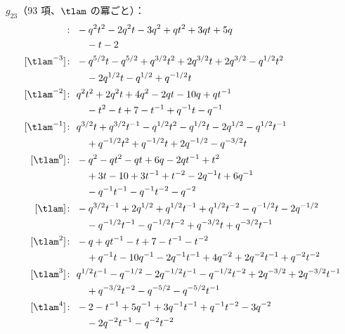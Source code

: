 $g_{23}$（93 項、$\tlam$ の冪ごと）：
\begin{align*}
[\tlam^{-4}]\colon\ & -q^{2} t^{2} -2 q^{2} t -3 q^{2} +q t^{2} +3 q t +5 q \\
& \quad -t -2 \\
[\tlam^{-3}]\colon\ & -q^{5/2} t -q^{5/2} +q^{3/2} t^{2} +2 q^{3/2} t +2 q^{3/2} -q^{1/2} t^{2} \\
& \quad -2 q^{1/2} t -q^{1/2} +q^{-1/2} t \\
[\tlam^{-2}]\colon\ & q^{2} t^{2} +2 q^{2} t +4 q^{2} -2 q t -10 q +q t^{-1} \\
& \quad -t^{2} -t +7 -t^{-1} +q^{-1} t -q^{-1} \\
[\tlam^{-1}]\colon\ & q^{3/2} t +q^{3/2} t^{-1} -q^{1/2} t^{2} -q^{1/2} t -2 q^{1/2} -q^{1/2} t^{-1} \\
& \quad +q^{-1/2} t^{2} +q^{-1/2} t +2 q^{-1/2} -q^{-3/2} t \\
[\tlam^{0}]\colon\ & -q^{2} -q t^{2} -q t +6 q -2 q t^{-1} +t^{2} \\
& \quad +3 t -10 +3 t^{-1} +t^{-2} -2 q^{-1} t +6 q^{-1} \\
& \quad -q^{-1} t^{-1} -q^{-1} t^{-2} -q^{-2} \\
[\tlam]\colon\ & -q^{3/2} t^{-1} +2 q^{1/2} +q^{1/2} t^{-1} +q^{1/2} t^{-2} -q^{-1/2} t -2 q^{-1/2} \\
& \quad -q^{-1/2} t^{-1} -q^{-1/2} t^{-2} +q^{-3/2} t +q^{-3/2} t^{-1} \\
[\tlam^{2}]\colon\ & -q +q t^{-1} -t +7 -t^{-1} -t^{-2} \\
& \quad +q^{-1} t -10 q^{-1} -2 q^{-1} t^{-1} +4 q^{-2} +2 q^{-2} t^{-1} +q^{-2} t^{-2} \\
[\tlam^{3}]\colon\ & q^{1/2} t^{-1} -q^{-1/2} -2 q^{-1/2} t^{-1} -q^{-1/2} t^{-2} +2 q^{-3/2} +2 q^{-3/2} t^{-1} \\
& \quad +q^{-3/2} t^{-2} -q^{-5/2} -q^{-5/2} t^{-1} \\
[\tlam^{4}]\colon\ & -2 -t^{-1} +5 q^{-1} +3 q^{-1} t^{-1} +q^{-1} t^{-2} -3 q^{-2} \\
& \quad -2 q^{-2} t^{-1} -q^{-2} t^{-2}
\end{align*}

